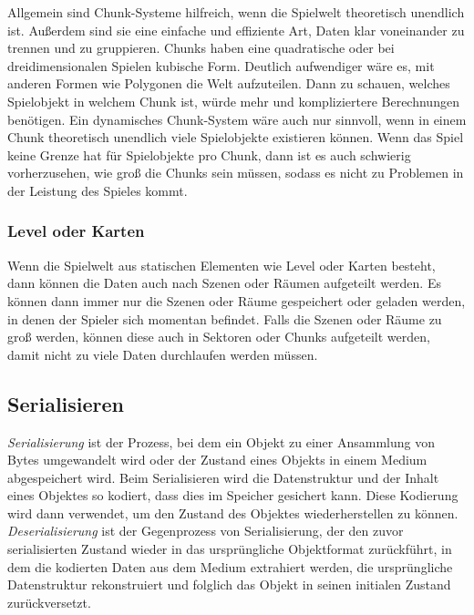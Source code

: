 Allgemein sind Chunk-Systeme hilfreich, wenn die Spielwelt theoretisch unendlich ist. Außerdem sind sie eine einfache und effiziente Art, Daten klar voneinander zu trennen und zu gruppieren. Chunks haben eine quadratische oder bei dreidimensionalen Spielen kubische Form. Deutlich aufwendiger wäre es, mit anderen Formen wie Polygonen die Welt aufzuteilen. Dann zu schauen, welches Spielobjekt in welchem Chunk ist, würde mehr und kompliziertere Berechnungen benötigen. Ein dynamisches Chunk-System wäre auch nur sinnvoll, wenn in einem Chunk theoretisch unendlich viele Spielobjekte existieren können. Wenn das Spiel keine Grenze hat für Spielobjekte pro Chunk, dann ist es auch schwierig vorherzusehen, wie groß die Chunks sein müssen, sodass es nicht zu Problemen in der Leistung des Spieles kommt. 

\subsubsection{Level oder Karten}
Wenn die Spielwelt aus statischen Elementen wie Level oder Karten besteht, dann können die Daten auch nach Szenen oder Räumen aufgeteilt werden. Es können dann immer nur die Szenen oder Räume gespeichert oder geladen werden, in denen der Spieler sich momentan befindet. Falls die Szenen oder Räume zu groß werden, können diese auch in Sektoren oder Chunks aufgeteilt werden, damit nicht zu viele Daten durchlaufen werden müssen.    


\subsection{Serialisieren}

\textit{Serialisierung} ist der Prozess, bei dem ein Objekt zu einer Ansammlung von Bytes umgewandelt wird oder der Zustand eines Objekts in einem Medium abgespeichert wird. Beim Serialisieren wird die Datenstruktur und der Inhalt eines Objektes so kodiert, dass dies im Speicher gesichert kann. Diese Kodierung wird dann verwendet, um den Zustand des Objektes wiederherstellen zu können. \textit{Deserialisierung} ist der Gegenprozess von Serialisierung, der den zuvor serialisierten Zustand wieder in das ursprüngliche Objektformat zurückführt, in dem die kodierten Daten aus dem Medium extrahiert werden, die ursprüngliche Datenstruktur rekonstruiert und folglich das Objekt in seinen initialen Zustand zurückversetzt.\cite{codeguruWorkingWith}

